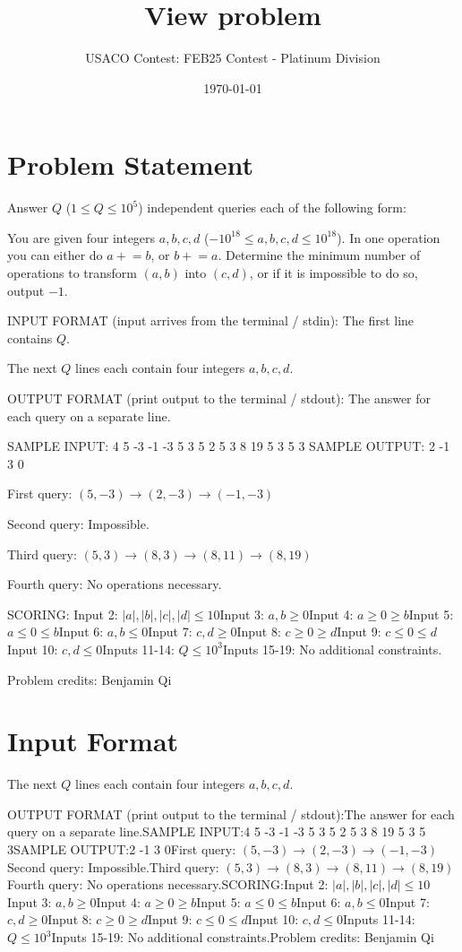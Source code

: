 \documentclass[12pt]{article}
\title{View problem}
\author{USACO Contest: FEB25 Contest - Platinum Division}
\date{\today}
\begin{document}
\maketitle

\section*{Problem Statement}


Answer $Q$ ($1\le Q\le 10^5$) independent queries each of the following form:

You are given four integers $a,b,c,d$ ($-10^{18}\le a,b,c,d\le 10^{18}$). In one
operation you can either do $a\mathrel{+}=b$,  or $b\mathrel{+}=a$. Determine
the minimum number of operations to transform $(a,b)$ into $(c,d)$, or if it is
impossible to do so, output $-1$. 

INPUT FORMAT (input arrives from the terminal / stdin):
The first line contains $Q$.

The next $Q$ lines each contain four integers $a,b,c,d$.

OUTPUT FORMAT (print output to the terminal / stdout):
The answer for each query on a separate line.

SAMPLE INPUT:
4
5 -3 -1 -3
5 3 5 2
5 3 8 19
5 3 5 3
SAMPLE OUTPUT: 
2
-1
3
0

First query: $(5,-3)\to (2,-3)\to (-1,-3)$

Second query: Impossible.

Third query: $(5,3) \to (8, 3) \to (8, 11) \to (8, 19)$

Fourth query: No operations necessary.

SCORING:
Input 2: $|a|, |b|, |c|,|d|\le 10$Input 3: $a,b\ge 0$Input 4: $a \geq 0 \geq b$Input 5: $a \leq 0 \leq b$Input 6: $a,b\le 0$Input 7: $c,d\ge 0$Input 8: $c \geq 0 \geq d$Input 9: $c \leq 0 \leq d$Input 10: $c,d\le 0$Inputs 11-14: $Q \leq 10^3$Inputs 15-19: No additional constraints.


Problem credits: Benjamin Qi



\section*{Input Format}
The next $Q$ lines each contain four integers $a,b,c,d$.

OUTPUT FORMAT (print output to the terminal / stdout):The answer for each query on a separate line.SAMPLE INPUT:4
5 -3 -1 -3
5 3 5 2
5 3 8 19
5 3 5 3SAMPLE OUTPUT:2
-1
3
0First query: $(5,-3)\to (2,-3)\to (-1,-3)$Second query: Impossible.Third query: $(5,3) \to (8, 3) \to (8, 11) \to (8, 19)$Fourth query: No operations necessary.SCORING:Input 2: $|a|, |b|, |c|,|d|\le 10$Input 3: $a,b\ge 0$Input 4: $a \geq 0 \geq b$Input 5: $a \leq 0 \leq b$Input 6: $a,b\le 0$Input 7: $c,d\ge 0$Input 8: $c \geq 0 \geq d$Input 9: $c \leq 0 \leq d$Input 10: $c,d\le 0$Inputs 11-14: $Q \leq 10^3$Inputs 15-19: No additional constraints.Problem credits: Benjamin Qi
\end{document}
